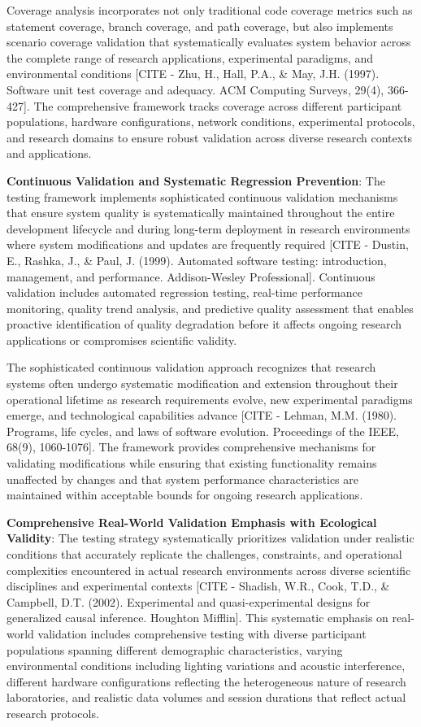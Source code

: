 \documentclass[11pt,a4paper]{report}
\begin{document}
Coverage analysis incorporates not only traditional code coverage metrics such as statement coverage, branch coverage,
and path coverage, but also implements scenario coverage validation that systematically evaluates system behavior across
the complete range of research applications, experimental paradigms, and environmental
conditions [CITE - Zhu, H., Hall, P.A., \& May, J.H. (1997). Software unit test coverage and adequacy. ACM Computing Surveys, 29(4), 366-427].
The comprehensive framework tracks coverage across different participant populations, hardware configurations, network
conditions, experimental protocols, and research domains to ensure robust validation across diverse research contexts
and applications.

\textbf{Continuous Validation and Systematic Regression Prevention}: The testing framework implements sophisticated
continuous validation mechanisms that ensure system quality is systematically maintained throughout the entire
development lifecycle and during long-term deployment in research environments where system modifications and updates
are frequently
required [CITE - Dustin, E., Rashka, J., \& Paul, J. (1999). Automated software testing: introduction, management, and performance. Addison-Wesley Professional].
Continuous validation includes automated regression testing, real-time performance monitoring, quality trend analysis,
and predictive quality assessment that enables proactive identification of quality degradation before it affects ongoing
research applications or compromises scientific validity.

The sophisticated continuous validation approach recognizes that research systems often undergo systematic modification
and extension throughout their operational lifetime as research requirements evolve, new experimental paradigms emerge,
and technological capabilities
advance [CITE - Lehman, M.M. (1980). Programs, life cycles, and laws of software evolution. Proceedings of the IEEE, 68(9), 1060-1076].
The framework provides comprehensive mechanisms for validating modifications while ensuring that existing functionality
remains unaffected by changes and that system performance characteristics are maintained within acceptable bounds for
ongoing research applications.

\textbf{Comprehensive Real-World Validation Emphasis with Ecological Validity}: The testing strategy systematically
prioritizes validation under realistic conditions that accurately replicate the challenges, constraints, and operational
complexities encountered in actual research environments across diverse scientific disciplines and experimental
contexts [CITE - Shadish, W.R., Cook, T.D., \& Campbell, D.T. (2002). Experimental and quasi-experimental designs for generalized causal inference. Houghton Mifflin].
This systematic emphasis on real-world validation includes comprehensive testing with diverse participant populations
spanning different demographic characteristics, varying environmental conditions including lighting variations and
acoustic interference, different hardware configurations reflecting the heterogeneous nature of research laboratories,
and realistic data volumes and session durations that reflect actual research protocols.
\end{document}
